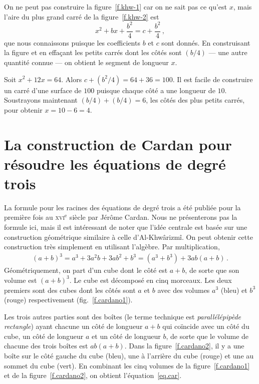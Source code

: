 On ne peut pas construire  la figure~\ref{f.khw-1} car on ne sait pas ce qu'est $x$, mais l'aire du plus grand carré de la figure~\ref{f.khw-2} est 
\[
x^2+bx+\frac{b^2}{4}=c+\frac{b^2}{4}\,,
\]
que nous connaissons puisque les coefficients $b$ et $c$  sont donnés. En construisant la figure  et en effaçant les petits carrés dont les côtés sont $(b/4)$ --- une autre quantité connue --- on obtient le segment  de longueur $x$.

\begin{example}
Soit $x^2+12x=64$. Alors $c+(b^2/4)=64+36=100$. Il est facile de construire un carré d'une surface de $100$ puisque chaque côté a une longueur de $10$. Soustrayons maintenant $(b/4)+(b/4)=6$, les côtés des plus petits carrés, pour obtenir $x=10-6=4$.
\end{example}

\section{La construction de Cardan  pour résoudre les équations de degré trois}\label{s.cardano}

La formule pour les racines des équations de degré trois a été publiée pour la première fois au \textsc{xvi}$^\text{e}$ siècle par Jérôme Cardan. Nous ne présenterons pas la formule ici, mais il est intéressant de noter que l'idée centrale est basée sur une construction géométrique similaire à celle d'Al-Khwârizmî. On peut obtenir cette construction très simplement en utilisant l'algèbre. Par multiplication,
\begin{align}\label{eq.car}
(a+b)^3=a^3+3a^2b+3ab^2+b^3=(a^3+b^3)+3ab(a+b)\,.
\end{align}
Géométriquement, on part d'un cube dont le côté est $a+b$, de sorte que son volume est $(a+b)^3$. Le cube est décomposé en cinq morceaux. Les deux premiers sont des cubes dont les côtés sont $a$ et $b$ avec des volumes $a^3$ (bleu) et $b^3$ (rouge)  respectivement (fig.~\ref{f.cardano1}).

Les trois autres parties sont des boîtes (le terme technique est \emph{parallélépipède  rectangle}) ayant chacune un côté de longueur $a+b$ qui coïncide avec un côté du cube, un côté de longueur $a$ et un côté de longueur $b$, de sorte que le volume de chacune des trois boîtes est $ab(a+b)$. Dans la figure~\ref{f.cardano2}, il y a une boîte sur le côté gauche du cube (bleu), une à l'arrière du cube (rouge) et une au sommet du cube (vert).
En combinant les cinq volumes de la figure~\ref{f.cardano1} et de la figure~\ref{f.cardano2}, on obtient l'équation~\ref{eq.car}.


